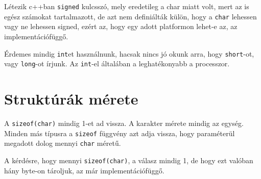\documentclass[a4paper,11.5pt,table]{article}
\begin{document}
	Létezik c++ban \texttt{signed} kulcsszó, mely eredetileg a char miatt volt, mert az is egész számokat tartalmazott, de azt nem definiálták külön, hogy a \texttt{char} lehessen vagy ne lehessen signed, ezért az, hogy egy adott platformon lehet-e az, az implementációfüggő.
	\begin{note}
		Érdemes mindig \texttt{int}et használnunk, hacsak nincs jó okunk arra, hogy \texttt{short}-ot, vagy \texttt{long}-ot írjunk. Az \texttt{int}-el általában a leghatékonyabb a processzor.
	\end{note}
	\section{Struktúrák mérete}
	A \texttt{sizeof(char)} mindig 1-et ad vissza. A karakter mérete mindig az egység. Minden más típusra a \texttt{sizeof} függvény azt adja vissza, hogy paraméterül megadott dolog mennyi \texttt{char} méretű. 
	
	A kérdésre, hogy mennyi \texttt{sizeof(char)}, a válasz mindig 1, de hogy ezt valóban hány byte-on tároljuk, az már implementációfüggő.
	
\end{document}
